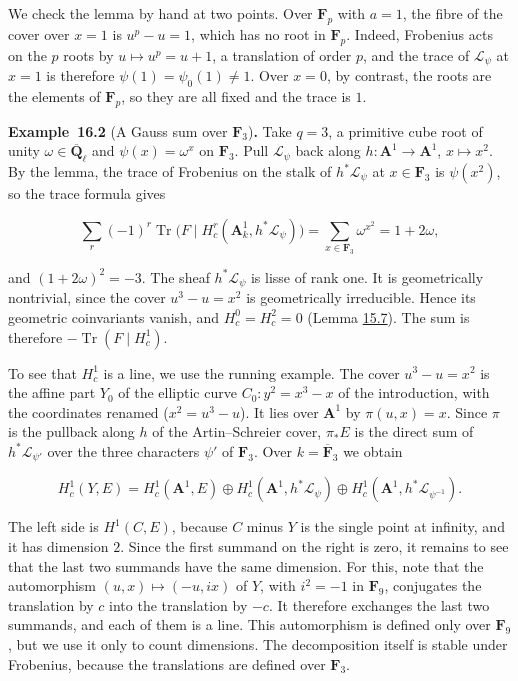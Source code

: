 \documentclass[11pt]{article}
\newenvironment{bpstatement}[2]{\par\addvspace{0.6\baselineskip}\noindent\textbf{#1}#2\textbf{.}\enspace\ignorespaces}
  {\par\addvspace{0.4\baselineskip}}
\begin{document}
\label{bp173}%
We check the lemma by hand at two points. Over \(\mathbf F_p\) with \(a=1\), the fibre of the cover over \(x=1\) is \(u^p-u=1\), which has no root in \(\mathbf F_p\). Indeed, Frobenius acts on the \(p\) roots by \(u\mapsto u^p=u+1\), a translation of order \(p\), and the trace of \(\mathcal L_\psi\) at \(x=1\) is therefore \(\psi(1)=\psi_0(1)\ne1\). Over \(x=0\), by contrast, the roots are the elements of \(\mathbf F_p\), so they are all fixed and the trace is \(1\).

\label{bp174}%
\begin{bpstatement}{Example~16.2}{ (A Gauss sum over $\mathbf F_3$)}
Take \(q=3\), a primitive cube root of unity \(\omega\in\overline{\mathbf Q}_\ell\) and \(\psi(x)=\omega^x\) on \(\mathbf F_3\). Pull \(\mathcal L_\psi\) back along \(h:\mathbf A^1\to\mathbf A^1\), \(x\mapsto x^2\). By the lemma, the trace of Frobenius on the stalk of \(h^*\mathcal L_\psi\) at \(x\in\mathbf F_3\) is \(\psi(x^2)\), so the trace formula gives

\[
\sum_r(-1)^r\operatorname{Tr}\bigl(F\mid H^r_c(\mathbf A^1_k,h^*\mathcal L_\psi)\bigr)
=\sum_{x\in\mathbf F_3}\omega^{x^2}=1+2\omega ,
\]

and \((1+2\omega)^2=-3\). The sheaf \(h^*\mathcal L_\psi\) is lisse of rank one. It is geometrically nontrivial, since the cover \(u^3-u=x^2\) is geometrically irreducible. Hence its geometric coinvariants vanish, and \(H^0_c=H^2_c=0\) (Lemma \hyperref[bp140]{15.7}). The sum is therefore \(-\operatorname{Tr}(F\mid H^1_c)\).

To see that \(H^1_c\) is a line, we use the running example. The cover \(u^3-u=x^2\) is the affine part \(Y_0\) of the elliptic curve \(C_0\colon y^2=x^3-x\) of the introduction, with the coordinates renamed (\(x^2=u^3-u\)). It lies over \(\mathbf A^1\) by \(\pi(u,x)=x\). Since \(\pi\) is the pullback along \(h\) of the Artin–Schreier cover, \(\pi_*E\) is the direct sum of \(h^*\mathcal L_{\psi'}\) over the three characters \(\psi'\) of \(\mathbf F_3\). Over \(k=\overline{\mathbf F}_3\) we obtain

\[
H^1_c(Y,E)=H^1_c(\mathbf A^1,E)\oplus H^1_c(\mathbf A^1,h^*\mathcal L_\psi)
\oplus H^1_c(\mathbf A^1,h^*\mathcal L_{\psi^{-1}}).
\]

The left side is \(H^1(C,E)\), because \(C\) minus \(Y\) is the single point at infinity, and it has dimension \(2\). Since the first summand on the right is zero, it remains to see that the last two summands have the same dimension. For this, note that the automorphism \((u,x)\mapsto(-u,ix)\) of \(Y\), with \(i^2=-1\) in \(\mathbf F_9\), conjugates the translation by \(c\) into the translation by \(-c\). It therefore exchanges the last two summands, and each of them is a line. This automorphism is defined only over \(\mathbf F_9\), but we use it only to count dimensions. The decomposition itself is stable under Frobenius, because the translations are defined over \(\mathbf F_3\).


\end{bpstatement}
\end{document}
